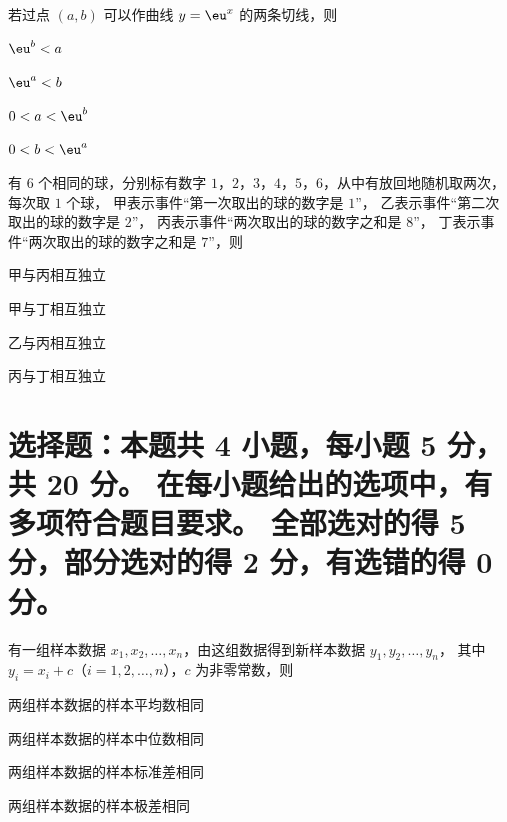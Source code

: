 \documentclass{exam-zh}
\begin{document}
\begin{question}
  若过点 $(a, b)$ 可以作曲线 $y = \eu^x$ 的两条切线，则 \paren
  \begin{choices}
    \item $\eu^b < a$
    \item $\eu^a < b$
    \item $0 < a < \eu^b$
    \item $0 < b < \eu^a$
  \end{choices}
\end{question}

\begin{question}
  有 $6$ 个相同的球，分别标有数字 $1$，$2$，$3$，$4$，$5$，$6$，从中有放回地随机取两次，每次取 $1$ 个球，
  甲表示事件“第一次取出的球的数字是 $1$”，
  乙表示事件“第二次取出的球的数字是 $2$”，
  丙表示事件“两次取出的球的数字之和是 $8$”，
  丁表示事件“两次取出的球的数字之和是 $7$”，则 \paren
  \begin{choices}
    \item 甲与丙相互独立
    \item 甲与丁相互独立
    \item 乙与丙相互独立
    \item 丙与丁相互独立
  \end{choices}
\end{question}



\section{%
  选择题：本题共 4 小题，每小题 5 分，共 20 分。
  在每小题给出的选项中，有多项符合题目要求。
  全部选对的得 5 分，部分选对的得 2 分，有选错的得 0 分。
}

\begin{question}
  有一组样本数据 $x_1, x_2, \dots, x_n$，由这组数据得到新样本数据 $y_1, y_2, \dots, y_n$，
  其中 $y_i = x_i + c$（$i = 1, 2, \dots, n$），$c$ 为非零常数，则 \paren
  \begin{choices}
    \item 两组样本数据的样本平均数相同
    \item 两组样本数据的样本中位数相同
    \item 两组样本数据的样本标准差相同
    \item 两组样本数据的样本极差相同
  \end{choices}
\end{question}
\end{document}
